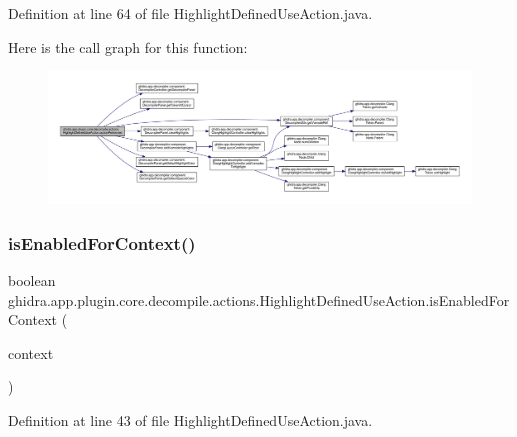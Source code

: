 Definition at line 64 of file Highlight\+Defined\+Use\+Action.\+java.

Here is the call graph for this function\+:
\nopagebreak
\begin{figure}[H]
\begin{center}
\leavevmode
\includegraphics[width=350pt]{classghidra_1_1app_1_1plugin_1_1core_1_1decompile_1_1actions_1_1_highlight_defined_use_action_a65cdffc68c8e31b8a97aa59ad6f0183c_cgraph}
\end{center}
\end{figure}
\mbox{\label{classghidra_1_1app_1_1plugin_1_1core_1_1decompile_1_1actions_1_1_highlight_defined_use_action_a583a431104b31a91221412fb9b7c0572}} 
\subsubsection{\texorpdfstring{isEnabledForContext()}{isEnabledForContext()}}
{\footnotesize\ttfamily boolean ghidra.\+app.\+plugin.\+core.\+decompile.\+actions.\+Highlight\+Defined\+Use\+Action.\+is\+Enabled\+For\+Context (\begin{DoxyParamCaption}\item[{Action\+Context}]{context }\end{DoxyParamCaption})\hspace{0.3cm}{\ttfamily [inline]}}



Definition at line 43 of file Highlight\+Defined\+Use\+Action.\+java.

